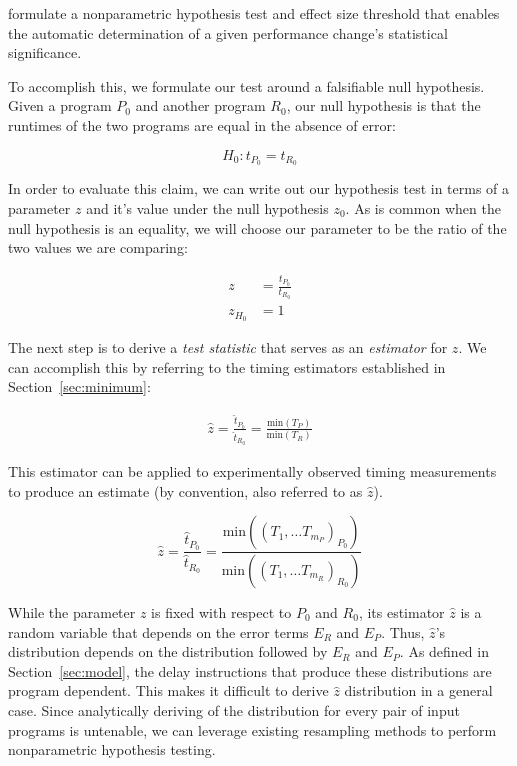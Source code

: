 \documentclass[conference]{IEEEtran}
\begin{document}
formulate a nonparametric hypothesis test and effect size threshold that enables the
automatic determination of a given performance change's statistical significance.

To accomplish this, we formulate our test around a falsifiable null hypothesis. Given a
program $P_0$ and another program $R_0$, our null hypothesis is that the runtimes of
the two programs are equal in the absence of error:

\begin{equation}
    H_0: t_{P_0} = t_{R_0}
\end{equation}

In order to evaluate this claim, we can write out our hypothesis test in terms of a
parameter $z$ and it's value under the null hypothesis $z_0$. As is common when the null
hypothesis is an equality, we will choose our parameter to be the ratio
of the two values we are comparing:

\begin{align}
    z   &= \frac{t_{P_0}}{t_{R_0}} \\
    z_{H_0} &= 1
\end{align}

The next step is to derive a \textit{test statistic} that serves as an \textit{estimator}
for $z$. We can accomplish this by referring to the timing estimators established in
Section~\ref{sec:minimum}:

\begin{align}
    \hat{z} = \frac{\hat{t}_{P_0}}{\hat{t}_{R_0}} = \frac{\textrm{min}(T_P)}{\textrm{min}(T_R)}
\end{align}

This estimator can be applied to experimentally observed timing measurements to produce an
estimate (by convention, also referred to as $\hat{z}$).

\begin{equation}
    \hat{z} = \frac{\hat{t}_{P_0}}{\hat{t}_{R_0}} = \frac{\textrm{min}((T_1, \dots T_{m_P})_{P_0})}{\textrm{min}((T_1, \dots T_{m_R})_{R_0})}
\end{equation}

While the parameter $z$ is fixed with respect to $P_0$ and $R_0$, its estimator $\hat{z}$ is
a random variable that depends on the error terms $E_R$ and $E_P$. Thus, $\hat{z}$'s
distribution depends on the distribution followed by $E_R$ and $E_P$. As defined in
Section~\ref{sec:model}, the delay instructions that produce these distributions are program
dependent. This makes it difficult to derive $\hat{z}$ distribution in a general case. Since
analytically deriving of the distribution for every pair of input programs is untenable, we
can leverage existing resampling methods to perform nonparametric hypothesis testing.
\end{document}
